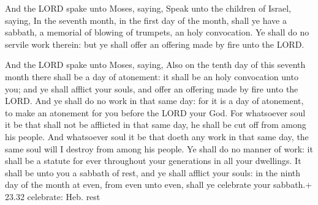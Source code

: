  And the LORD spake unto Moses, saying, 
Speak unto the children of Israel, saying, In the seventh month, in the
first day of the month, shall ye have a sabbath, a memorial of blowing
of trumpets, an holy convocation.  Ye shall do no servile
work therein: but ye shall offer an offering made by fire unto the LORD.

 And the LORD spake unto Moses, saying, 
Also on the tenth day of this seventh month there shall be a day of
atonement: it shall be an holy convocation unto you; and ye shall
afflict your souls, and offer an offering made by fire unto the LORD.
 And ye shall do no work in that same day: for it is a day
of atonement, to make an atonement for you before the LORD your God.
 For whatsoever soul it be that shall not be afflicted in
that same day, he shall be cut off from among his people. 
And whatsoever soul it be that doeth any work in that same day, the same
soul will I destroy from among his people.  Ye shall do no
manner of work: it shall be a statute for ever throughout your
generations in all your dwellings.  It shall be unto you a
sabbath of rest, and ye shall afflict your souls: in the ninth day of
the month at even, from even unto even, shall ye celebrate your
sabbath.+ 23.32 celebrate: Heb. rest

